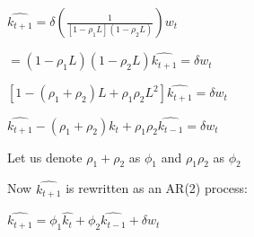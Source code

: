 \documentclass[11pt, oneside]{article}   	%
\begin{document}
$\widehat{k_{t+1}} = \delta(\frac{1}{[1-\rho_1 L] (1-\rho_2 L)})w_t$

$=(1-\rho_1 L)(1-\rho_2 L)\widehat{k_{t+1}} = \delta w_t$

$[1-(\rho_1 + \rho_2)L + \rho_1 \rho_2 L^2]\widehat{k_{t+1}} = \delta w_t$

$\widehat{k_{t+1}} - (\rho_1 + \rho_2)\hat{k_t} + \rho_1 \rho_2 \widehat{k_{t-1}} = \delta w_t$

Let us denote $\rho_1 + \rho_2$ as $\phi_1$ and $\rho_1 \rho_2$ as $\phi_2$

Now $\widehat{k_{t+1}}$ is rewritten as an AR(2) process:

$\widehat{k_{t+1}} = \phi_1 \hat{k_t} + \phi_2 \hat{k_{t-1}} + \delta w_t$
\end{document}
